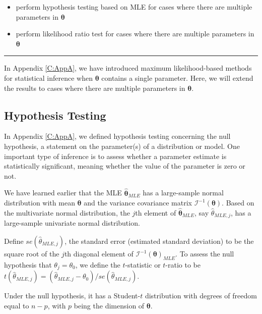 \documentclass[]{book}
\providecommand{\tightlist}{%
  \setlength{\itemsep}{0pt}\setlength{\parskip}{0pt}}
\theoremstyle{definition}
\theoremstyle{definition}
\theoremstyle{definition}
\theoremstyle{remark}
\begin{document}
\begin{itemize}
\tightlist
\item
  perform hypothesis testing based on MLE for cases where there are
  multiple parameters in \(\boldsymbol\theta\)
\item
  perform likelihood ratio test for cases where there are multiple
  parameters in \(\boldsymbol\theta\)
\end{itemize}

\begin{center}\rule{0.5\linewidth}{\linethickness}\end{center}

In Appendix \ref{C:AppA}, we have introduced maximum likelihood-based
methods for statistical inference when \(\boldsymbol\theta\) contains a
single parameter. Here, we will extend the results to cases where there
are multiple parameters in \(\boldsymbol\theta\).

\subsection{Hypothesis Testing}\label{hypothesis-testing}

In Appendix \ref{C:AppA}, we defined hypothesis testing concerning the
null hypothesis, a statement on the parameter(s) of a distribution or
model. One important type of inference is to assess whether a parameter
estimate is statistically significant, meaning whether the value of the
parameter is zero or not.

We have learned earlier that the MLE \(\hat{\boldsymbol{\theta}}_{MLE}\)
has a large-sample normal distribution with mean \(\boldsymbol \theta\)
and the variance covariance matrix
\(\mathcal{I}^{-1}(\boldsymbol \theta)\). Based on the multivariate
normal distribution, the \(j\)th element of
\(\hat{\boldsymbol{\theta}}_{MLE}\), say \(\hat{\theta}_{MLE,j}\), has a
large-sample univariate normal distribution.

Define \(se(\hat{\theta}_{MLE,j})\), the standard error (estimated
standard deviation) to be the square root of the \(j\)th diagonal
element of \(\mathcal{I}^{-1}(\boldsymbol \theta)_{MLE}\). To assess the
null hypothesis that \(\theta_j=\theta_0\), we define the
\(t\)-statistic or \(t\)-ratio to be
\(t(\hat{\theta}_{MLE,j})=(\hat{\theta}_{MLE,j}-\theta_0)/se(\hat{\theta}_{MLE,j})\).

Under the null hypothesis, it has a Student-\(t\) distribution with
degrees of freedom equal to \(n-p\), with \(p\) being the dimension of
\(\boldsymbol{\theta}\).
\end{document}
